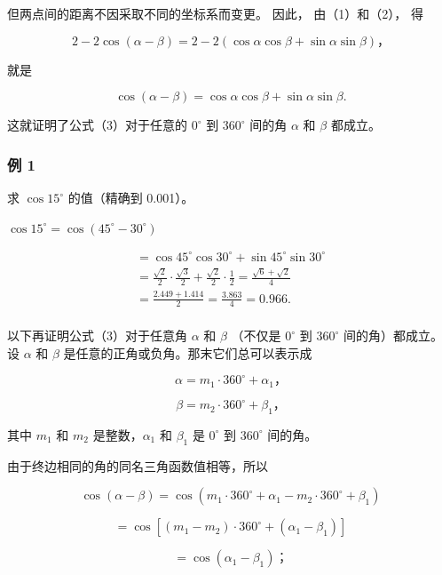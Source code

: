 但两点间的距离不因采取不同的坐标系而变更。 因此， 由（1）和（2）， 得

\[
2 - 2 \cos (\alpha - \beta) = 2 - 2 (\cos \alpha \cos \beta + \sin \alpha \sin \beta)\text{，}
\]

就是

\[
\cos (\alpha - \beta) = \cos \alpha \cos \beta + \sin \alpha \sin \beta . \tag {3}
\]

这就证明了公式（3）对于任意的 \(0^{\circ}\) 到 \(360^{\circ}\) 间的角
\(\alpha\) 和 \(\beta\) 都成立。

\subsubsection{例 1}

求 \(\cos15^{\circ}\) 的值（精确到 0.001）。

 \(\cos 15^{\circ} = \cos (45^{\circ} - 30^{\circ})\)

\[
\begin{array}{l} = \cos 45 ^{\circ} \cos 30 ^{\circ} + \sin 45 ^{\circ} \sin 30 ^{\circ} \\ = \frac {\sqrt {2}}{2} \cdot \frac {\sqrt {3}}{2} + \frac {\sqrt {2}}{2} \cdot \frac {1}{2} = \frac {\sqrt {6} + \sqrt {2}}{4} \\ = \frac {2.449 + 1.414}{2} = \frac {3.863}{4} = 0.966. \\ \end{array}
\]

以下再证明公式（3）对于任意角 \(\alpha\) 和 \(\beta\) （不仅是
\(0^{\circ}\) 到 \(360^{\circ}\) 间的角）都成立。设 \(\alpha\) 和
\(\beta\) 是任意的正角或负角。那末它们总可以表示成

\[
\alpha = m _ {1} \cdot 360 ^{\circ} + \alpha_ {1}\text{，}
\]

\[
\beta = m _ {2} \cdot 360 ^{\circ} + \beta_ {1}\text{，}
\]

其中 \(m_{1}\) 和 \(m_{2}\) 是整数，\(\alpha_{1}\) 和 \(\beta_{1}\) 是
\(0^{\circ}\) 到 \(360^{\circ}\) 间的角。

由于终边相同的角的同名三角函数值相等，所以

\[
\cos (\alpha - \beta) = \cos \left(m _ {1} \cdot 360 ^{\circ} + \alpha_ {1} - m _ {2} \cdot 360 ^{\circ} + \beta_ {1}\right)
\]

\[
= \cos \left[ \left(m _ {1} - m _ {2}\right) \cdot 360 ^{\circ} + \left(\alpha_ {1} - \beta_ {1}\right) \right]
\]

\[
= \cos (\alpha_ {1} - \beta_ {1})\text{；}
\]


